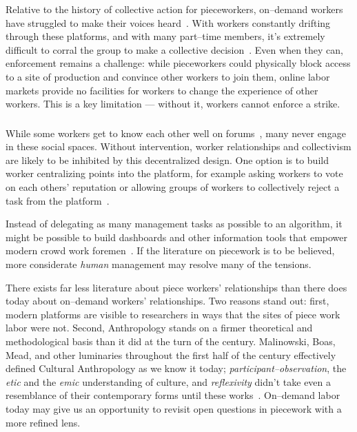 \documentclass[pn4226]{subfiles}
\begin{document}
Relative to the history of collective action for pieceworkers,
on--demand workers have struggled to make their voices heard~\cite{dynamo,storiesIraniSilberman,turkopticon}.
With workers constantly drifting through these platforms, and with many part--time members,
it's extremely difficult to corral the group to make a collective decision~\cite{dynamo}.
Even when they can, enforcement remains a challenge:
while pieceworkers could physically block access to a site of production and convince other workers to join them,
online labor markets provide no facilities for workers to change the experience of other workers.
This is a key limitation --- without it, workers cannot enforce a strike.


\subsubsection{\implication}
While some workers get to know each other well on forums~\cite{martin2014being,crowdcollab}, many never engage in these social spaces.
Without intervention, worker relationships and collectivism are likely to be inhibited by this decentralized design.
One option is to build worker centralizing points into the platform, for example asking workers to vote on each others' reputation or allowing groups of workers to collectively reject a task from the platform~\cite{crowdguilds}.

Instead of delegating as many management tasks as possible to an algorithm,
it might be possible to build dashboards and
other information tools that empower modern crowd work foremen~\cite{kulkarni2012mobileworks}.
If the literature on piecework is to be believed,
more considerate \textit{human} management may resolve
many of the tensions.

There exists far less literature about piece workers' relationships than there does today about on--demand workers' relationships.
Two reasons stand out: first, modern platforms are visible to researchers in ways that the sites of piece work labor were not.
Second, Anthropology stands on a firmer theoretical and methodological basis than it did at the turn of the  century.
Malinowski, Boas, Mead, and
other luminaries throughout the first half of the  century
effectively defined Cultural Anthropology as we know it today;
\textit{participant--observation},
the \textit{etic} and the \textit{emic} understanding of culture, and
\textit{reflexivity}
didn't take even a resemblance of their contemporary forms until these works~\cite{malinowski2002argonauts,boas1940race,mead1973coming}.
On--demand labor today may give us an opportunity to revisit open questions in piecework with a more refined lens.





\end{document}
